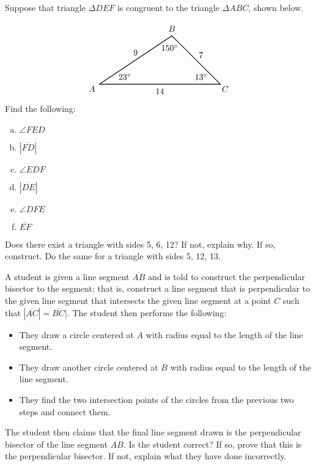 \documentclass[11pt,letterpaper]{article}
\begin{document}

 Suppose that triangle $\Delta DEF$ is congruent to the triangle $\Delta ABC$, shown below. \par
	\[
	\begin{tikzpicture}
	\draw[line width=0.03cm] (0,0) -- (3,2) -- (5,0) -- (0,0);
	\node at (-0.3,-0.2) {$A$};
	\node at (3,2.3) {$B$};
	\node at (5.2,-0.2) {$C$};
	\node at (1.5,1.3) {$9$}; 
	\node at (4.2,1.2) {$7$}; 
	\node at (2.5,-0.3) {$14$}; 
	\node at (1.05,0.3) {$23^\circ$};
	\node at (4.2,0.3) {$13^\circ$};
	\node at (2.9,1.5) {$150^\circ$};
	\end{tikzpicture}
	\]
Find the following:
	\begin{enumerate}[(a)]
	\item $\angle FED$
	\item $|\overline{FD}|$
	\item $\angle EDF$
	\item $|\overline{DE}|$
	\item $\angle DFE$
	\item $\overline{EF}$
	\end{enumerate}



\newpage



 Does there exist a triangle with sides 5, 6, 12? If not, explain why. If so, construct. Do the same for a triangle with sides 5, 12, 13. 



\newpage



 A student is given a line segment $\overline{AB}$ and is told to construct the perpendicular bisector to the segment; that is, construct a line segment that is perpendicular to the given line segment that intersects the given line segment at a point $C$ such that $|\overline{AC}|= \overline{BC}|$. The student then performs the following:
	\begin{itemize}
	\item They draw a circle centered at $A$ with radius equal to the length of the line segment. 
	\item They draw another circle centered at $B$ with radius equal to the length of the line segment. 
	\item They find the two intersection points of the circles from the previous two steps and connect them.
	\end{itemize}
The student then claims that the final line segment drawn is the perpendicular bisector of the line segment $\overline{AB}$. Is the student correct? If so, prove that this is the perpendicular bisector. If not, explain what they have done incorrectly. 
\end{document}
